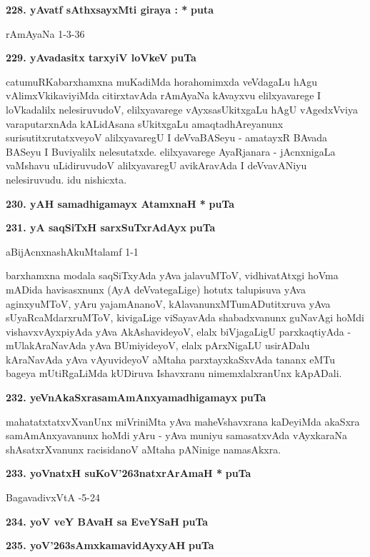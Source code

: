\medskip
\noindent
\textbf{228. yAvatf sAthxsayxMti giraya : *} \hfill{\bf puta }

\hfill{rAmAyaNa 1-3-36}

\medskip
\noindent
\textbf{229. yAvadasitx tarxyiV loVkeV} \hfill{\bf puTa }

\smallskip
catumuRKabarxhamxna muKadiMda horahomimxda veVdagaLu hAgu vAlimxVkikaviyiMda citirxtavAda rAmAyaNa kAvayxvu elilxyavarege I loVkadalilx nelesiruvudoV, elilxyavarege vAyxsasUkitxgaLu hAgU vAgedxVviya varaputarxnAda kALidAsana sUkitxgaLu amaqtadhAreyanunx surisutitxrutatxveyoV alilxyavaregU I deVvaBASeyu - amatayxR BAvada BASeyu I Buviyalilx nelesutatxde. elilxyavarege AyaRjanara - jAcnxnigaLa vaMshavu uLidiruvudoV alilxyavaregU avikAravAda I deVvavANiyu nelesiruvudu. idu nishicxta.

\medskip
\noindent
\textbf{230. yAH samadhigamayx AtamxnaH *} \hfill{\bf puTa }

\medskip
\noindent
\textbf{231. yA saqSiTxH sarxSuTxrAdAyx} \hfill{\bf puTa }

\hfill{aBijAcnxnashAkuMtalamf 1-1}

\smallskip
barxhamxna modala saqSiTxyAda yAva jalavuMToV, vidhivatAtxgi hoVma \hbox{mADida} havisasxnunx (AyA deVvategaLige) hotutx talupisuva yAva aginxyuMToV, yAru yajamAnanoV, kAlavanunxMTumADutitxruva yAva sUyaRcaMdarxruMToV, kivigaLige viSayavAda shabadxvanunx guNavAgi hoMdi vishavxvAyxpiyAda yAva AkAshavideyoV, elalx biVjagaLigU parxkaqtiyAda - mUlakAraNavAda yAva BUmiyideyoV, elalx pArxNigaLU usirADalu kAraNavAda yAva vAyuvideyoV aMtaha parxtayxkaSxvAda tananx eMTu bageya mUtiRgaLiMda kUDiruva Ishavxranu nimemxlalxranUnx kApADali.

\medskip
\noindent
\textbf{232. yeVnAkaSxrasamAmAnxyamadhigamayx} \hfill{\bf puTa }

\smallskip
mahatatxtatxvXvanUnx miVriniMta yAva maheVshavxrana kaDeyiMda akaSxra samAmAnxyavanunx hoMdi yAru - yAva muniyu samasatxvAda vAyxkaraNa shAsatxrXvanunx racisidanoV aMtaha pANinige namasAkxra.

\medskip
\noindent
\textbf{233. yoVnatxH suKoV\char'263natxrArAmaH *} \hfill{\bf puTa }

\hfill{BagavadivxVtA -5-24}

\medskip
\noindent
\textbf{234. yoV veY BAvaH sa EveYSaH} \hfill{\bf puTa }

\medskip
\noindent
\textbf{235. yoV\char'263sAmxkamavidAyxyAH} \hfill{\bf puTa }

